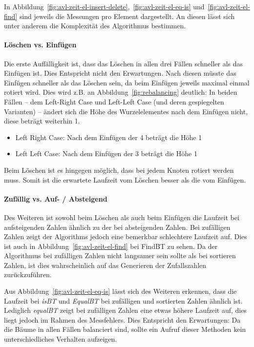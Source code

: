 In Abbildung~\ref{fig:avl-zeit-el-insert-delete},~\ref{fig:avl-zeit-el-eq-is}
und~\ref{fig:avl-zeit-el-find} sind jeweils die Messungen pro Element dargestellt.
An diesen lässt sich unter anderem die Komplexität des Algorithmus bestimmen.

\paragraph{Löschen vs. Einfügen}
Die erste Auffälligkeit ist, dass das Löschen in allen drei Fällen schneller als das Einfügen ist.
Dies Entspricht nicht den Erwartungen.
Nach diesen müsste das Einfügen schneller als das Löschen sein, da beim Einfügen jeweils maximal
einmal rotiert wird.
Dies wird z.B. an Abbildung~\ref{fig:rebalancing} deutlich:
In beiden Fällen -- dem Left-Right Case und Left-Left Case (und deren gespiegelten Varianten) --
ändert sich die Höhe des Wurzelelementes nach dem Einfügen nicht, diese beträgt weiterhin 1.
\begin{itemize}
    \item Left Right Case: Nach dem Einfügen der 4 beträgt die Höhe 1
    \item Left Left Case: Nach dem Einfügen der 3 beträgt die Höhe 1
\end{itemize}
Beim Löschen ist es hingegen möglich, dass bei jedem Knoten rotiert werden muss.
Somit ist die erwartete Laufzeit vom Löschen besser als die vom Einfügen.

\paragraph{Zufällig vs. Auf- / Absteigend}
Des Weiteren ist sowohl beim Löschen als auch beim Einfügen die Laufzeit bei aufsteigenden Zahlen
ähnlich zu der bei absteigenden Zahlen.
Bei zufälligen Zahlen zeigt der Algorithms jedoch eine bemerkbar schlechtere Laufzeit auf.
Dies ist auch in Abbildung~\ref{fig:avl-zeit-el-find} bei FindBT zu sehen.
Da der Algorithmus bei zufälligen Zahlen nicht langsamer sein sollte als bei sortieren Zahlen, ist
dies wahrscheinlich auf das Generieren der Zufallszahlen zurückzuführen.

Aus Abbildung~\ref{fig:avl-zeit-el-eq-is} lässt sich des Weiteren erkennen, dass die Laufzeit
bei \textit{isBT} und \textit{EqualBT} bei zufälligen und sortierten Zahlen ähnlich ist.
Lediglich \textit{equalBT} zeigt bei zufälligen Zahlen eine etwas höhere Laufzeit auf, dies liegt
jedoch im Rahmen des Messfehlers.
Dies Entspricht den Erwartungen: Da die Bäume in allen Fällen balanciert sind, sollte ein Aufruf
dieser Methoden kein unterschiedliches Verhalten aufzeigen.

